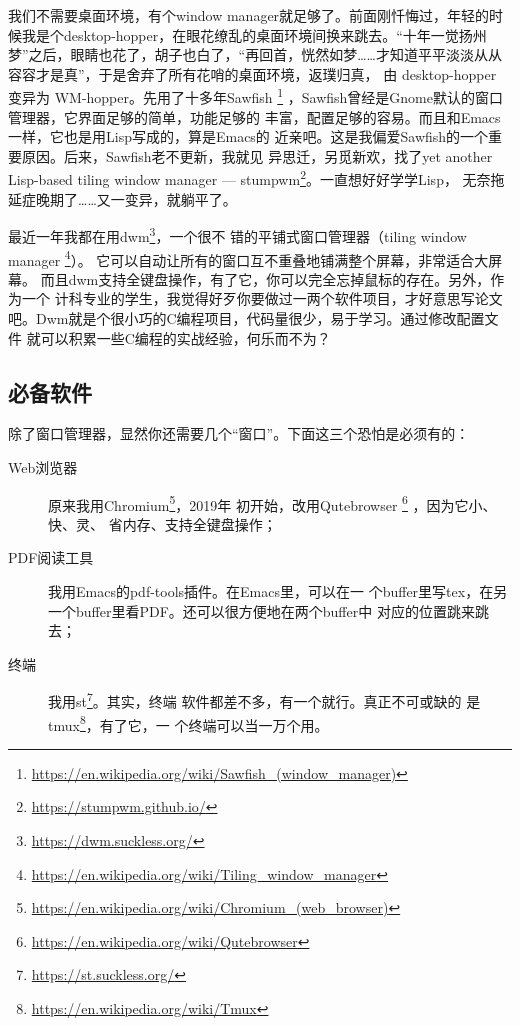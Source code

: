 我们不需要桌面环境，有个window manager就足够了。前面刚忏悔过，年轻的时
候我是个desktop-hopper，在眼花缭乱的桌面环境间换来跳去。“十年一觉扬州
梦”之后，眼睛也花了，胡子也白了，“再回首，恍然如梦……才知道平平淡淡从从
容容才是真”，于是舍弃了所有花哨的桌面环境，返璞归真，
由 desktop-hopper 变异为 WM-hopper。先用了十多年Sawfish%
\footnote{\url{https://en.wikipedia.org/wiki/Sawfish_(window_manager)}}
，Sawfish曾经是Gnome默认的窗口管理器，它界面足够的简单，功能足够的
丰富，配置足够的容易。而且和Emacs一样，它也是用Lisp写成的，算是Emacs的
近亲吧。这是我偏爱Sawfish的一个重要原因。后来，Sawfish老不更新，我就见
异思迁，另觅新欢，找了yet another Lisp-based tiling window manager ---
stumpwm\footnote{\url{https://stumpwm.github.io/}}。一直想好好学学Lisp，
无奈拖延症晚期了……又一变异，就躺平了。

最近一年我都在用dwm\footnote{\url{https://dwm.suckless.org/}}，一个很不
错的平铺式窗口管理器（tiling window manager%
\footnote{\url{https://en.wikipedia.org/wiki/Tiling_window_manager}}）。%
它可以自动让所有的窗口互不重叠地铺满整个屏幕，非常适合大屏幕。%
而且dwm支持全键盘操作，有了它，你可以完全忘掉鼠标的存在。另外，作为一个
计科专业的学生，我觉得好歹你要做过一两个软件项目，才好意思写论文
吧。Dwm就是个很小巧的C编程项目，代码量很少，易于学习。通过修改配置文件
就可以积累一些C编程的实战经验，何乐而不为？

\subsection{必备软件}

除了窗口管理器，显然你还需要几个“窗口”。下面这三个恐怕是必须有的：

\begin{description}
\item[Web浏览器] 原来我用Chromium\footnote{%
    \url{https://en.wikipedia.org/wiki/Chromium_(web_browser)}}，2019年
  初开始，改用Qutebrowser \footnote{%
    \url{https://en.wikipedia.org/wiki/Qutebrowser}} ，因为它小、快、灵、
  省内存、支持全键盘操作；
\item[PDF阅读工具] 我用Emacs的pdf-tools插件。在Emacs里，可以在一
  个buffer里写tex，在另一个buffer里看PDF。还可以很方便地在两个buffer中
  对应的位置跳来跳去；
\item[终端] 我用st\footnote{\url{https://st.suckless.org/}}。其实，终端
  软件都差不多，有一个就行。真正不可或缺的
  是tmux\footnote{\url{https://en.wikipedia.org/wiki/Tmux}}，有了它，一
  个终端可以当一万个用。
\end{description}

